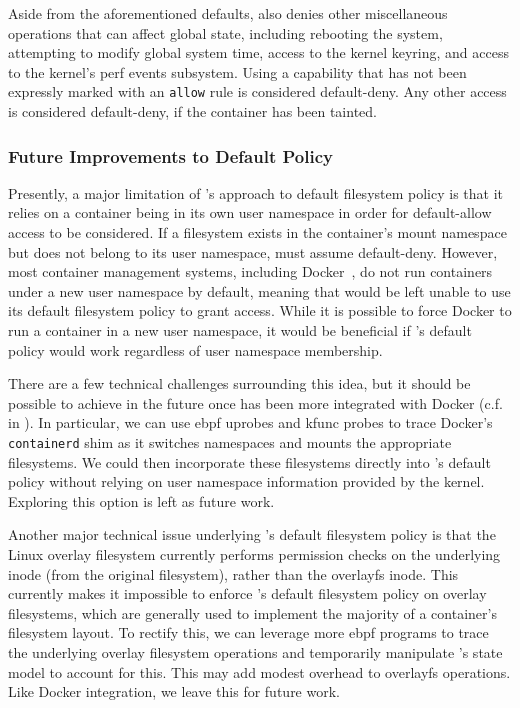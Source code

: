 Aside from the aforementioned defaults, \bpfcontain{} also denies other miscellaneous
operations that can affect global state, including rebooting the system, attempting to
modify global system time, access to the kernel keyring, and access to the kernel's perf
events subsystem. Using a capability that has not been expressly marked with
an \texttt{allow} rule is considered default-deny. Any other access is considered
default-deny, if the container has been tainted.

\subsubsection{Future Improvements to Default Policy}%
\label{sss:bpfcontain-improving-default}

Presently, a major limitation of \bpfcontain{}'s approach to default filesystem policy is
that it relies on a container being in its own user namespace in order for default-allow
access to be considered. If a filesystem exists in the container's mount namespace but
does not belong to its user namespace, \bpfcontain{} must assume default-deny. However,
most container management systems, including Docker~\cite{docker_security}, do not run
containers under a new user namespace by default, meaning that \bpfcontain{} would be left
unable to use its default filesystem policy to grant access. While it is possible to force
Docker to run a container in a new user namespace, it would be beneficial if
\bpfcontain{}'s default policy would work regardless of user namespace membership.

There are a few technical challenges surrounding this idea, but it should be possible to
achieve in the future once \bpfcontain{} has been more integrated with Docker
(c.f.\  in ). In particular, we can use
\gls{ebpf} uprobes and kfunc probes to trace Docker's \texttt{containerd} shim as it switches
namespaces and mounts the appropriate filesystems. We could then incorporate these
filesystems directly into \bpfcontain{}'s default policy without relying on user
namespace information provided by the kernel. Exploring this option is left as future work.

Another major technical issue underlying \bpfcontain{}'s default filesystem policy is that
the Linux overlay filesystem currently performs permission checks on the underlying inode
(from the original filesystem), rather than the overlayfs inode. This currently makes it
impossible to enforce \bpfcontain{}'s default filesystem policy on overlay filesystems,
which are generally used to implement the majority of a container's filesystem layout.  To
rectify this, we can leverage more \gls{ebpf} programs to trace the underlying overlay
filesystem operations and temporarily manipulate \bpfcontain{}'s state model to account
for this. This may add modest overhead to overlayfs operations. Like Docker integration,
we leave this for future work.

